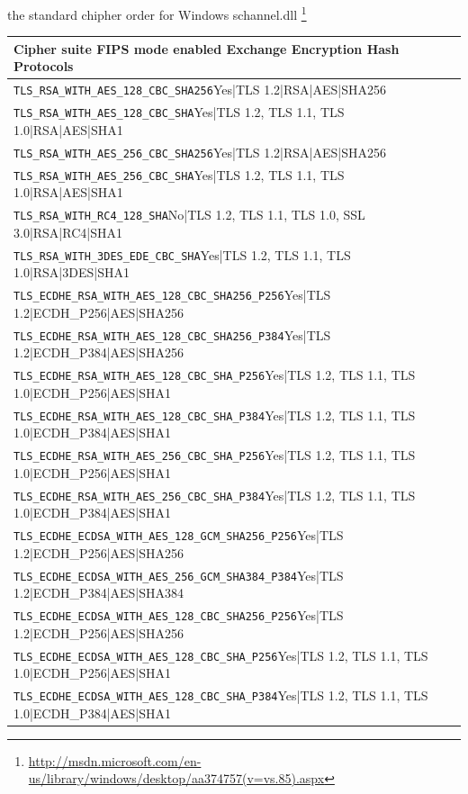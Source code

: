 the standard chipher order for Windows schannel.dll \footnote{\url{http://msdn.microsoft.com/en-us/library/windows/desktop/aa374757(v=vs.85).aspx}}
\begin{table}[h]
  \centering
  \small
  \begin{tabular}{ll}
    \toprule
    Cipher suite	FIPS mode enabled	Exchange	Encryption	Hash	Protocols\\
    \midrule
\verb |TLS_RSA_WITH_AES_128_CBC_SHA256|Yes|TLS 1.2|RSA|AES|SHA256\\
\verb |TLS_RSA_WITH_AES_128_CBC_SHA|Yes|TLS 1.2, TLS 1.1, TLS 1.0|RSA|AES|SHA1\\
\verb |TLS_RSA_WITH_AES_256_CBC_SHA256|Yes|TLS 1.2|RSA|AES|SHA256\\
\verb |TLS_RSA_WITH_AES_256_CBC_SHA|Yes|TLS 1.2, TLS 1.1, TLS 1.0|RSA|AES|SHA1\\
\verb |TLS_RSA_WITH_RC4_128_SHA|No|TLS 1.2, TLS 1.1, TLS 1.0, SSL 3.0|RSA|RC4|SHA1\\
\verb |TLS_RSA_WITH_3DES_EDE_CBC_SHA|Yes|TLS 1.2, TLS 1.1, TLS 1.0|RSA|3DES|SHA1\\
\verb |TLS_ECDHE_RSA_WITH_AES_128_CBC_SHA256_P256|Yes|TLS 1.2|ECDH_P256|AES|SHA256\\
\verb |TLS_ECDHE_RSA_WITH_AES_128_CBC_SHA256_P384|Yes|TLS 1.2|ECDH_P384|AES|SHA256\\
\verb |TLS_ECDHE_RSA_WITH_AES_128_CBC_SHA_P256|Yes|TLS 1.2, TLS 1.1, TLS 1.0|ECDH_P256|AES|SHA1\\
\verb |TLS_ECDHE_RSA_WITH_AES_128_CBC_SHA_P384|Yes|TLS 1.2, TLS 1.1, TLS 1.0|ECDH_P384|AES|SHA1\\
\verb |TLS_ECDHE_RSA_WITH_AES_256_CBC_SHA_P256|Yes|TLS 1.2, TLS 1.1, TLS 1.0|ECDH_P256|AES|SHA1\\
\verb |TLS_ECDHE_RSA_WITH_AES_256_CBC_SHA_P384|Yes|TLS 1.2, TLS 1.1, TLS 1.0|ECDH_P384|AES|SHA1\\
\verb |TLS_ECDHE_ECDSA_WITH_AES_128_GCM_SHA256_P256|Yes|TLS 1.2|ECDH_P256|AES|SHA256\\
\verb |TLS_ECDHE_ECDSA_WITH_AES_256_GCM_SHA384_P384|Yes|TLS 1.2|ECDH_P384|AES|SHA384\\
\verb |TLS_ECDHE_ECDSA_WITH_AES_128_CBC_SHA256_P256|Yes|TLS 1.2|ECDH_P256|AES|SHA256\\
\verb |TLS_ECDHE_ECDSA_WITH_AES_128_CBC_SHA_P256|Yes|TLS 1.2, TLS 1.1, TLS 1.0|ECDH_P256|AES|SHA1\\
\verb |TLS_ECDHE_ECDSA_WITH_AES_128_CBC_SHA_P384|Yes|TLS 1.2, TLS 1.1, TLS 1.0|ECDH_P384|AES|SHA1\\

\end{tabular}
\end{table}
